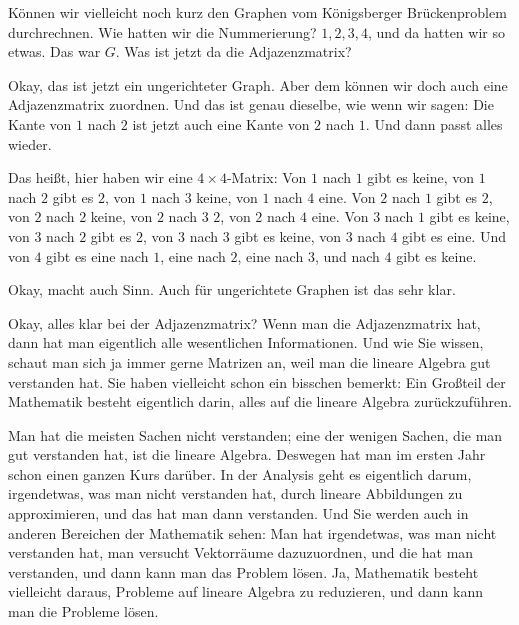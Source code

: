\begin{spoken-clean}[00:34:51 - 00:37:48]
Können wir vielleicht noch kurz den Graphen vom Königsberger Brückenproblem durchrechnen. Wie hatten wir die Nummerierung? $1, 2, 3, 4$, und da hatten wir so etwas. Das war $G$. Was ist jetzt da die Adjazenzmatrix?

Okay, das ist jetzt ein ungerichteter Graph. Aber dem können wir doch auch eine Adjazenzmatrix zuordnen. Und das ist genau dieselbe, wie wenn wir sagen: Die Kante von $1$ nach $2$ ist jetzt auch eine Kante von $2$ nach $1$. Und dann passt alles wieder.

Das heißt, hier haben wir eine $4 \times 4$-Matrix: Von $1$ nach $1$ gibt es keine, von $1$ nach $2$ gibt es $2$, von $1$ nach $3$ keine, von $1$ nach $4$ eine. Von $2$ nach $1$ gibt es $2$, von $2$ nach $2$ keine, von $2$ nach $3$ $2$, von $2$ nach $4$ eine. Von $3$ nach $1$ gibt es keine, von $3$ nach $2$ gibt es $2$, von $3$ nach $3$ gibt es keine, von $3$ nach $4$ gibt es eine. Und von $4$ gibt es eine nach $1$, eine nach $2$, eine nach $3$, und nach $4$ gibt es keine.

Okay, macht auch Sinn. Auch für ungerichtete Graphen ist das sehr klar.

Okay, alles klar bei der Adjazenzmatrix? Wenn man die Adjazenzmatrix hat, dann hat man eigentlich alle wesentlichen Informationen. Und wie Sie wissen, schaut man sich ja immer gerne Matrizen an, weil man die lineare Algebra gut verstanden hat. Sie haben vielleicht schon ein bisschen bemerkt: Ein Großteil der Mathematik besteht eigentlich darin, alles auf die lineare Algebra zurückzuführen.

Man hat die meisten Sachen nicht verstanden; eine der wenigen Sachen, die man gut verstanden hat, ist die lineare Algebra. Deswegen hat man im ersten Jahr schon einen ganzen Kurs darüber. In der Analysis geht es eigentlich darum, irgendetwas, was man nicht verstanden hat, durch lineare Abbildungen zu approximieren, und das hat man dann verstanden. Und Sie werden auch in anderen Bereichen der Mathematik sehen: Man hat irgendetwas, was man nicht verstanden hat, man versucht Vektorräume dazuzuordnen, und die hat man verstanden, und dann kann man das Problem lösen. Ja, Mathematik besteht vielleicht daraus, Probleme auf lineare Algebra zu reduzieren, und dann kann man die Probleme lösen.
\end{spoken-clean}

